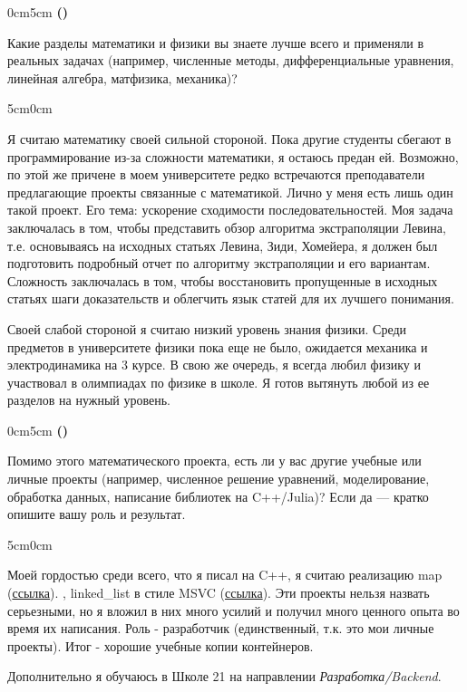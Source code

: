 \documentclass[a4paper,10pt]{article}
\newcounter{questioncounter}
\newenvironment{xquestion}{%
    \par\vspace{2.5mm}%
    \refstepcounter{questioncounter}
    \begin{adjustwidth}{0cm}{5cm}%
        \bfseries
        (\thequestioncounter)\
        \ignorespaces
}{%
    \end{adjustwidth}%
    \par\vspace{2.5mm}%
    \ignorespacesafterend
}
\newenvironment{xanswer}{%
    \par\vspace{2.5mm}%
    \begin{adjustwidth}{5cm}{0cm}%
        \ignorespaces
}{%
    \end{adjustwidth}%
    \par\vspace{2.5mm}%
    \ignorespacesafterend
}
\begin{document}
\begin{xquestion}
    Какие разделы математики и физики вы знаете лучше всего и применяли в реальных
    задачах (например, численные методы, дифференциальные уравнения, линейная
    алгебра, матфизика, механика)?
\end{xquestion}

\begin{xanswer}
    Я считаю математику своей сильной стороной.
    Пока другие студенты сбегают в
    программирование из-за сложности математики, я остаюсь предан ей.
    Возможно, по этой же причене в моем университете редко встречаются
    преподаватели предлагающие проекты связанные с математикой.
    Лично у меня есть лишь один такой проект. Его тема:
    ускорение сходимости последовательностей.
    Моя задача заключалась в том, чтобы представить обзор
    алгоритма экстраполяции Левина, т.е. основываясь на исходных статьях
    Левина, Зиди, Хомейера, я должен был подготовить подробный отчет по
    алгоритму экстраполяции и его вариантам. Сложность заключалась в том, чтобы
    восстановить пропущенные в исходных статьях шаги доказательств и облегчить
    язык статей для их лучшего понимания.

    \vspace{3mm}
    Своей слабой стороной я считаю низкий уровень знания физики. Среди предметов в
    университете физики пока еще не было, ожидается механика и электродинамика
    на 3 курсе. В свою же очередь, я всегда любил физику и участвовал в
    олимпиадах по физике в школе. Я готов вытянуть любой из ее разделов на
    нужный уровень.
\end{xanswer}

\begin{xquestion}
    Помимо этого математического проекта, есть ли у вас другие учебные или личные
    проекты (например, численное решение уравнений, моделирование, обработка
    данных, написание библиотек на C++/Julia)?
    Если да — кратко опишите вашу роль и результат.
\end{xquestion}

\begin{xanswer}
    Моей гордостью среди всего, что я писал на C++, я считаю
    реализацию 
    map
    (\href{https://github.com/va9abond/ac-oop-120-210/blob/5f8d870432ea67c01eeb23eb4ae490cf1b057921/p4-tree/tree.cpp#L204}{ссылка}). ,
    linked\_list в стиле MSVC
    (\href{https://github.com/va9abond/ac-oop-120-210/blob/5f8d870432ea67c01eeb23eb4ae490cf1b057921/p4-tree/tree.cpp#L778}{ссылка}).
    Эти проекты нельзя назвать серьезными,
    но я вложил в них много усилий и получил много ценного опыта
    во время их написания.
    Роль - разработчик (единственный, т.к. это
    мои личные проекты). Итог - хорошие учебные копии контейнеров.

    \vspace{3mm}
    Дополнительно я обучаюсь в Школе 21 на направлении
    {\itshape Разработка/Backend}.
\end{xanswer}
\end{document}
